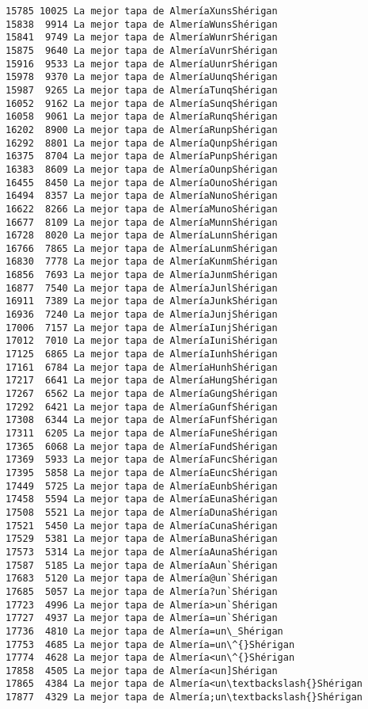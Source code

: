\documentclass[11pt]{article}
\begin{document}
\begin{Verbatim}[commandchars=\\\{\}]
15785 10025 La mejor tapa de AlmeríaXunsShérigan
15838  9914 La mejor tapa de AlmeríaWunsShérigan
15841  9749 La mejor tapa de AlmeríaWunrShérigan
15875  9640 La mejor tapa de AlmeríaVunrShérigan
15916  9533 La mejor tapa de AlmeríaUunrShérigan
15978  9370 La mejor tapa de AlmeríaUunqShérigan
15987  9265 La mejor tapa de AlmeríaTunqShérigan
16052  9162 La mejor tapa de AlmeríaSunqShérigan
16058  9061 La mejor tapa de AlmeríaRunqShérigan
16202  8900 La mejor tapa de AlmeríaRunpShérigan
16292  8801 La mejor tapa de AlmeríaQunpShérigan
16375  8704 La mejor tapa de AlmeríaPunpShérigan
16383  8609 La mejor tapa de AlmeríaOunpShérigan
16455  8450 La mejor tapa de AlmeríaOunoShérigan
16494  8357 La mejor tapa de AlmeríaNunoShérigan
16622  8266 La mejor tapa de AlmeríaMunoShérigan
16677  8109 La mejor tapa de AlmeríaMunnShérigan
16728  8020 La mejor tapa de AlmeríaLunnShérigan
16766  7865 La mejor tapa de AlmeríaLunmShérigan
16830  7778 La mejor tapa de AlmeríaKunmShérigan
16856  7693 La mejor tapa de AlmeríaJunmShérigan
16877  7540 La mejor tapa de AlmeríaJunlShérigan
16911  7389 La mejor tapa de AlmeríaJunkShérigan
16936  7240 La mejor tapa de AlmeríaJunjShérigan
17006  7157 La mejor tapa de AlmeríaIunjShérigan
17012  7010 La mejor tapa de AlmeríaIuniShérigan
17125  6865 La mejor tapa de AlmeríaIunhShérigan
17161  6784 La mejor tapa de AlmeríaHunhShérigan
17217  6641 La mejor tapa de AlmeríaHungShérigan
17267  6562 La mejor tapa de AlmeríaGungShérigan
17292  6421 La mejor tapa de AlmeríaGunfShérigan
17308  6344 La mejor tapa de AlmeríaFunfShérigan
17311  6205 La mejor tapa de AlmeríaFuneShérigan
17365  6068 La mejor tapa de AlmeríaFundShérigan
17369  5933 La mejor tapa de AlmeríaFuncShérigan
17395  5858 La mejor tapa de AlmeríaEuncShérigan
17449  5725 La mejor tapa de AlmeríaEunbShérigan
17458  5594 La mejor tapa de AlmeríaEunaShérigan
17508  5521 La mejor tapa de AlmeríaDunaShérigan
17521  5450 La mejor tapa de AlmeríaCunaShérigan
17529  5381 La mejor tapa de AlmeríaBunaShérigan
17573  5314 La mejor tapa de AlmeríaAunaShérigan
17587  5185 La mejor tapa de AlmeríaAun`Shérigan
17683  5120 La mejor tapa de Almería@un`Shérigan
17685  5057 La mejor tapa de Almería?un`Shérigan
17723  4996 La mejor tapa de Almería>un`Shérigan
17727  4937 La mejor tapa de Almería=un`Shérigan
17736  4810 La mejor tapa de Almería=un\_Shérigan
17753  4685 La mejor tapa de Almería=un\^{}Shérigan
17774  4628 La mejor tapa de Almería<un\^{}Shérigan
17858  4505 La mejor tapa de Almería<un]Shérigan
17865  4384 La mejor tapa de Almería<un\textbackslash{}Shérigan
17877  4329 La mejor tapa de Almería;un\textbackslash{}Shérigan

\end{Verbatim}
\end{document}
